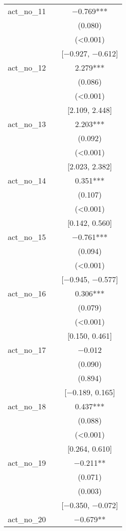 \documentclass[
]{article}
\begin{document}
\begin{table}[H]
\begin{tabular}[t]{lcc}
act\_no\_11 &  & \num{-0.769}***\\
 &  & (\num{0.080})\\
 &  & \vphantom{9} (\num{<0.001})\\
 &  & {}[\num{-0.927}, \num{-0.612}]\\
act\_no\_12 &  & \num{2.279}***\\
 &  & \vphantom{1} (\num{0.086})\\
 &  & \vphantom{8} (\num{<0.001})\\
 &  & {}[\num{2.109}, \num{2.448}]\\
act\_no\_13 &  & \num{2.203}***\\
 &  & (\num{0.092})\\
 &  & \vphantom{7} (\num{<0.001})\\
 &  & {}[\num{2.023}, \num{2.382}]\\
act\_no\_14 &  & \num{0.351}***\\
 &  & (\num{0.107})\\
 &  & \vphantom{6} (\num{<0.001})\\
 &  & {}[\num{0.142}, \num{0.560}]\\
act\_no\_15 &  & \num{-0.761}***\\
 &  & (\num{0.094})\\
 &  & \vphantom{5} (\num{<0.001})\\
 &  & {}[\num{-0.945}, \num{-0.577}]\\
act\_no\_16 &  & \num{0.306}***\\
 &  & (\num{0.079})\\
 &  & \vphantom{4} (\num{<0.001})\\
 &  & {}[\num{0.150}, \num{0.461}]\\
act\_no\_17 &  & \num{-0.012}\\
 &  & (\num{0.090})\\
 &  & (\num{0.894})\\
 &  & {}[\num{-0.189}, \num{0.165}]\\
act\_no\_18 &  & \num{0.437}***\\
 &  & (\num{0.088})\\
 &  & \vphantom{3} (\num{<0.001})\\
 &  & {}[\num{0.264}, \num{0.610}]\\
act\_no\_19 &  & \num{-0.211}**\\
 &  & (\num{0.071})\\
 &  & (\num{0.003})\\
 &  & {}[\num{-0.350}, \num{-0.072}]\\
act\_no\_20 &  & \num{-0.679}**\\

\end{tabular}
\end{table}
\end{document}
